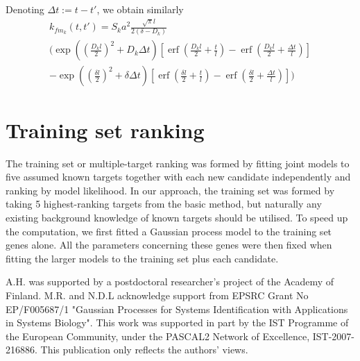 \documentclass{pnastwo}
\newcommand{\erf}{\operatorname{erf}}
\begin{document}
\begin{article}
\begin{materials}
  Denoting $\Delta t := t - t'$, we obtain similarly
  \begin{multline*}
    k_{f m_k}(t, t')
    = S_k a^2 \frac{\sqrt{\pi} l}{2(\delta - D_k)} \\
    \bigg(
    \exp\left(\left(\frac{D_k l}{2}\right)^2 + D_k \Delta t \right)
    [\erf(\frac{D_k l}{2} + \frac{t}{l}) - \erf(\frac{D_k l}{2} + \frac{\Delta t}{l})] \\
    -
    \exp\left(\left(\frac{\delta l}{2}\right)^2 + \delta \Delta t\right)
    [\erf(\frac{\delta l}{2} + \frac{t}{l}) - \erf(\frac{\delta l}{2} + \frac{\Delta t}{l})]
    \bigg)
  \end{multline*}

  \section{Training set ranking}
  The training set or multiple-target ranking was formed by fitting
  joint models to five assumed known targets together with each new
  candidate independently and ranking by model likelihood.  In our
  approach, the training set was formed by taking 5 highest-ranking
  targets from the basic method, but naturally any existing background
  knowledge of known targets should be utilised.  To speed up the
  computation, we first fitted a Gaussian process model to the
  training set genes alone.  All the parameters concerning these genes
  were then fixed when fitting the larger models to the training set
  plus each candidate.

\end{materials}

\begin{acknowledgments}
A.H. was supported by a postdoctoral researcher's project of the Academy of Finland.
M.R. and N.D.L acknowledge support from EPSRC Grant No EP/F005687/1 "Gaussian Processes for Systems Identification with Applications in Systems Biology". 
This work was supported in part by the IST Programme of the European Community, under the PASCAL2 Network of Excellence, IST-2007-216886. This publication only reflects the authors' views.
\end{acknowledgments}




%
\end{article}

\end{document}
